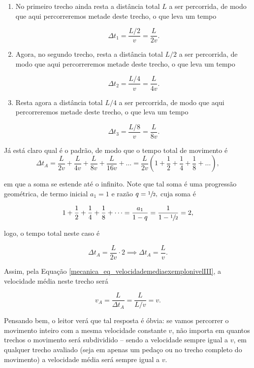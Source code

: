 \begin{exemplo}
\begin{itemize}
    \begin{enumerate}
        \item [(i)] No primeiro trecho ainda resta a distância total $L$ a ser percorrida, de modo que aqui percorreremos metade deste trecho, o que leva um tempo 

        $$ \Delta t_1 = \dfrac{L/2}{v} = \dfrac{L}{2v}.$$


        \item [(ii)] Agora, no segundo trecho, resta a distância total $L/2$ a ser percorrida, de modo que aqui percorreremos metade deste trecho, o que leva um tempo

        $$ \Delta t_2 = \dfrac{L/4}{v} = \dfrac{L}{4v}.$$


        \item[(iii)]  Resta agora a distância total $L/4$ a ser percorrida, de modo que aqui percorreremos metade deste trecho, o que leva um tempo

        $$ \Delta t_3 = \dfrac{L/8}{v} = \dfrac{L}{8v}.$$
    \end{enumerate}

Já está claro qual é o padrão, de modo que o tempo total de movimento é 
$$\Delta t_A = \dfrac{L}{2v}+\dfrac{L}{4v}+\dfrac{L}{8v}+\dfrac{L}{16v}+\dots  = \dfrac{L}{2v} \left( 1+\dfrac{1}{2} + \dfrac{1}{4} + \dfrac{1}{8}+\dots \right),$$

\noindent em que a soma se estende até o infinito. Note que tal soma é uma progressão geométrica, de termo inicial $a_1=1$ e razão $q=\sfrac{1}{2},$ cuja soma é 

 $$ 1+\dfrac{1}{2} + \dfrac{1}{4} + \dfrac{1}{8}+\dots = \dfrac{a_1}{1-q} = \dfrac{1}{1-\sfrac{1}{2}} = 2,$$

 \noindent logo, o tempo total neste caso é 

 $$ \Delta t_A = \dfrac{L}{2v}\cdot 2 \implies \Delta t_A = \dfrac{L}{v}.$$

 Assim, pela Equação \eqref{mecanica_eq_velocidademediaexemplonivelIII}, a velocidade média neste trecho será

 $$ \boxed{ v_A = \dfrac{L}{\Delta t_A} = \dfrac{L}{L/v} = v}.$$

 Pensando bem, o leitor verá que tal resposta é óbvia: se vamos percorrer o movimento inteiro com a mesma velocidade constante $v$, não importa em quantos trechos o movimento será subdividido -- sendo a velocidade sempre igual a $v$, em qualquer trecho avaliado (seja em apenas um pedaço ou no trecho completo do movimento) a velocidade média será sempre igual a $v.$ \\
 

\end{itemize}
\end{exemplo}
